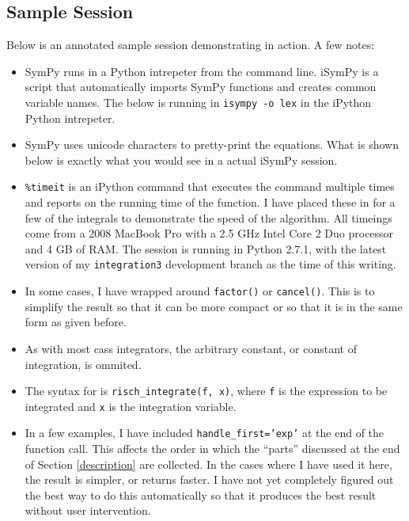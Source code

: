 \subsection{Sample Session} 
\label{sample}

Below is an annotated sample session demonstrating \rischintegrate{} in action.  A few notes:
\begin{itemize}
\item SymPy runs in a Python intrepeter from the command line.
iSymPy is a script that automatically imports SymPy functions and
creates common variable names.  The below is running in \texttt{isympy
-o lex} in the iPython Python intrepeter.

\item SymPy uses unicode characters to pretty-print the equations. 
What is shown below is exactly what you would see in a actual iSymPy
session.

\item \texttt{\%timeit} is an iPython command that executes the command
multiple times and reports on the running time of the function. I have
placed these in for a few of the integrals to demonstrate the speed of
the algorithm.  All timeings come from a 2008 MacBook Pro with a 2.5 GHz
Intel Core 2 Duo processor and 4 GB of RAM.  The session is running in
Python 2.7.1, with the latest version of my \texttt{integration3}
development branch as the time of this writing.  

\item In some cases, I have wrapped \rischintegrate{} around
\texttt{factor()} or \texttt{cancel()}.  This is to simplify the result
so that it can be more compact or so that it is in the same form as
given before.

\item As with most \glspl{cas} integrators, the arbitrary constant, or
constant of integration, is ommited.  

\item The syntax for \rischintegrate{} is \texttt{risch\_integrate(f, x)},
where \texttt{f} is the expression to be integrated and \texttt{x} is
the integration variable.

\item In a few examples, I have included \texttt{handle\_first='exp'} at
the end of the \rischintegrate{} function call.  This affects the order in
which the ``parts'' discussed at the end of Section \ref{description}
are collected.  In the cases where I have used it here, the result is
simpler, or returns faster.  I have not yet completely figured out the
best way to do this automatically so that it produces the best result
without user intervention.  


\end{itemize}
